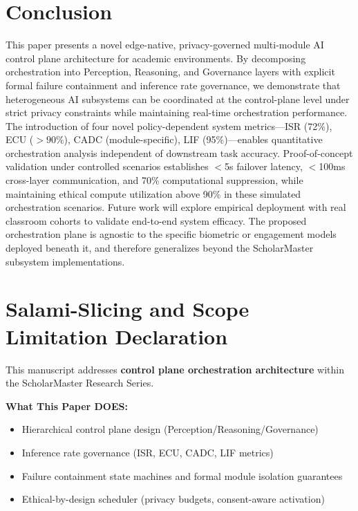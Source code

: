 \documentclass[conference]{IEEEtran}
\begin{document}
\section{Conclusion}

This paper presents a novel edge-native, privacy-governed multi-module AI control plane architecture for academic environments. By decomposing orchestration into Perception, Reasoning, and Governance layers with explicit formal failure containment and inference rate governance, we demonstrate that heterogeneous AI subsystems can be coordinated at the control-plane level under strict privacy constraints while maintaining real-time orchestration performance. The introduction of four novel policy-dependent system metrics---ISR (72\%), ECU ($>90\%$), CADC (module-specific), LIF (95\%)---enables quantitative orchestration analysis independent of downstream task accuracy. Proof-of-concept validation under controlled scenarios establishes $<$5s failover latency, $<$100ms cross-layer communication, and 70\% computational suppression, while maintaining ethical compute utilization above 90\% in these simulated orchestration scenarios. Future work will explore empirical deployment with real classroom cohorts to validate end-to-end system efficacy. The proposed orchestration plane is agnostic to the specific biometric or engagement models deployed beneath it, and therefore generalizes beyond the ScholarMaster subsystem implementations.

\section*{Salami-Slicing and Scope Limitation Declaration}

This manuscript addresses \textbf{control plane orchestration architecture} within the ScholarMaster Research Series.

\textbf{What This Paper DOES:}
\begin{itemize}
    \item Hierarchical control plane design (Perception/Reasoning/Governance)
    \item Inference rate governance (ISR, ECU, CADC, LIF metrics)
    \item Failure containment state machines and formal module isolation guarantees
    \item Ethical-by-design scheduler (privacy budgets, consent-aware activation)
\end{itemize}
\end{document}
